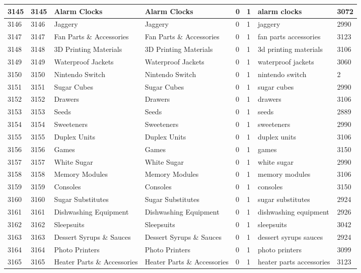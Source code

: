 \begin{longtable}{|l|l|l|l|l|l|l|l|}
3145 & 3145 & Alarm Clocks & Alarm Clocks & 0 & 1 & alarm clocks & 3072 \\ \hline 
3146 & 3146 & Jaggery & Jaggery & 0 & 1 & jaggery & 2990 \\ \hline 
3147 & 3147 & Fan Parts \& Accessories & Fan Parts \& Accessories & 0 & 1 & fan parts accessories & 3123 \\ \hline 
3148 & 3148 & 3D Printing Materials & 3D Printing Materials & 0 & 1 & 3d printing materials & 3106 \\ \hline 
3149 & 3149 & Waterproof Jackets & Waterproof Jackets & 0 & 1 & waterproof jackets & 3060 \\ \hline 
3150 & 3150 & Nintendo Switch & Nintendo Switch & 0 & 1 & nintendo switch & 2 \\ \hline 
3151 & 3151 & Sugar Cubes & Sugar Cubes & 0 & 1 & sugar cubes & 2990 \\ \hline 
3152 & 3152 & Drawers & Drawers & 0 & 1 & drawers & 3106 \\ \hline 
3153 & 3153 & Seeds & Seeds & 0 & 1 & seeds & 2889 \\ \hline 
3154 & 3154 & Sweeteners & Sweeteners & 0 & 1 & sweeteners & 2990 \\ \hline 
3155 & 3155 & Duplex Units & Duplex Units & 0 & 1 & duplex units & 3106 \\ \hline 
3156 & 3156 & Games & Games & 0 & 1 & games & 3150 \\ \hline 
3157 & 3157 & White Sugar & White Sugar & 0 & 1 & white sugar & 2990 \\ \hline 
3158 & 3158 & Memory Modules & Memory Modules & 0 & 1 & memory modules & 3106 \\ \hline 
3159 & 3159 & Consoles & Consoles & 0 & 1 & consoles & 3150 \\ \hline 
3160 & 3160 & Sugar Substitutes & Sugar Substitutes & 0 & 1 & sugar substitutes & 2924 \\ \hline 
3161 & 3161 & Dishwashing Equipment & Dishwashing Equipment & 0 & 1 & dishwashing equipment & 2926 \\ \hline 
3162 & 3162 & Sleepsuits & Sleepsuits & 0 & 1 & sleepsuits & 3042 \\ \hline 
3163 & 3163 & Dessert Syrups \& Sauces & Dessert Syrups \& Sauces & 0 & 1 & dessert syrups sauces & 2924 \\ \hline 
3164 & 3164 & Photo Printers & Photo Printers & 0 & 1 & photo printers & 3099 \\ \hline 
3165 & 3165 & Heater Parts \& Accessories & Heater Parts \& Accessories & 0 & 1 & heater parts accessories & 3123 \\ \hline 

\end{longtable}
